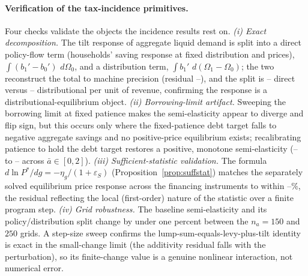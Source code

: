 \documentclass[12pt]{article}
\providecommand{\pendingnum}{\textit{--}}
\providecommand{\covPolExact}{\pendingnum}\providecommand{\covDistExact}{\pendingnum}
\providecommand{\covReconResid}{\pendingnum}
\providecommand{\epsAbarRecalLo}{\pendingnum}\providecommand{\epsAbarRecalHi}{\pendingnum}
\providecommand{\suffMaxRelErr}{\pendingnum}
\newcommand{\dd}{\,d}
\begin{document}
\paragraph{Verification of the tax-incidence primitives.} Four checks
validate the objects the incidence results rest on. \emph{(i) Exact
decomposition.} The tilt response of aggregate liquid demand is split into a
direct policy-flow term (households' saving response at fixed distribution
and prices), $\int(b_1'-b_0')\,\dd\Omega_0$, and a distribution term,
$\int b_1'\,\dd(\Omega_1-\Omega_0)$; the two reconstruct the total to
machine precision (residual $\covReconResid$), and the split is
$\covPolExact$ direct versus $\covDistExact$ distributional per unit of
revenue, confirming the response is a distributional-equilibrium object.
\emph{(ii) Borrowing-limit artifact.} Sweeping the borrowing limit at fixed
patience makes the semi-elasticity appear to diverge and flip sign, but this
occurs only where the fixed-patience debt target falls to negative aggregate
savings and no positive-price equilibrium exists; recalibrating patience to
hold the debt target restores a positive, monotone semi-elasticity
($\epsAbarRecalLo$ to $\epsAbarRecalHi$ across $\bar a\in[0,2]$).
\emph{(iii) Sufficient-statistic validation.} The formula
$d\ln P^{*}/dg=-\eta_g/(1+\varepsilon_S)$ (Proposition~\ref{prop:suffstat})
matches the separately solved equilibrium price response across the financing
instruments to within $\suffMaxRelErr\%$, the residual reflecting the local
(first-order) nature of the statistic over a finite program step.
\emph{(iv) Grid robustness.} The baseline semi-elasticity and its
policy/distribution split change by under one percent between the $n_a=150$
and $250$ grids. A step-size sweep confirms the lump-sum-equals-levy-plus-tilt
identity is exact in the small-change limit (the additivity residual falls
with the perturbation), so its finite-change value is a genuine nonlinear
interaction, not numerical error.
\end{document}
